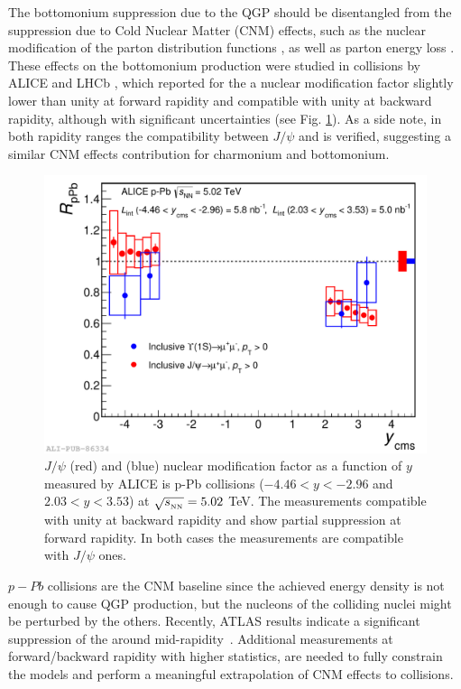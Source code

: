 The bottomonium suppression due to the QGP should be disentangled from the suppression due to Cold Nuclear Matter (CNM) effects, such as the nuclear modification of the parton distribution functions \cite{Eskola:1998df,Eskola:2009uj}, as well as parton energy loss \cite{Arleo:2012rs}.
These effects on the bottomonium production were studied in \ppb collisions by ALICE \cite{Abelev:2014oea} and LHCb \cite{Aaij:2014mza}, which reported for the \upsis a nuclear modification factor slightly lower than unity at forward rapidity and compatible with unity at backward rapidity, although with significant uncertainties (see Fig. \ref{fig:ALICE_pPb_jpsi_upsi}).
As a side note, in both rapidity ranges the compatibility between $J/\psi$ and \upsis is verified, suggesting a similar CNM effects contribution for charmonium and bottomonium.

\begin{figure}[!t]
\begin{center}
\includegraphics[width=0.8\linewidth]{Chapters/Analysis/Figs/2014-Oct-08-RpPb_Ups_Jpsi_b.pdf}
\caption{$J/\psi$ (red) and \upsis (blue) nuclear modification factor as a function of $y$ measured by ALICE is p-Pb collisions ($-4.46<y<-2.96$ and $2.03<y<3.53$) at $\sqrt{s_{_{\rm NN}}}=5.02$ \rm{TeV}. The \upsis measurements compatible with unity at backward rapidity and show partial suppression at forward rapidity. In both cases the \upsis measurements are compatible with $J/\psi$ ones.}
\label{fig:ALICE_pPb_jpsi_upsi}
\end{center}
\end{figure}

$p-Pb$ collisions are the CNM baseline since the achieved energy density is not enough to cause QGP production, but the nucleons of the colliding nuclei might be perturbed by the others.
Recently, ATLAS results indicate a significant suppression of the \upsis around mid-rapidity~\cite{Aaboud:2017cif}.  
Additional measurements at forward/backward rapidity with higher statistics, are needed to fully constrain the models and perform a meaningful extrapolation of CNM effects to \pbpb collisions.

